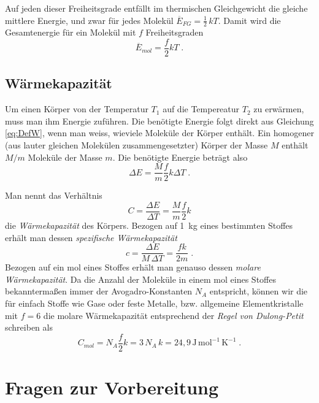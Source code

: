 Auf jeden dieser Freiheitsgrade entfällt im thermischen Gleichgewicht die gleiche mittlere Energie, und zwar für jedes Molekül $\overline{E}_{FG}= \frac{1}{2}\, kT$. Damit wird die Gesamtenergie für ein Molekül mit $f$ Freiheitsgraden
\begin{equation} \label{eq:DefW}
 \overline{E}_{mol} = \frac{f}{2}kT\; .
\end{equation}

\subsection{Wärmekapazität}

Um einen Körper von der Temperatur $T_1$ auf die Tempereatur $T_2$ zu erwärmen, muss man ihm Energie zuführen. Die benötigte Energie folgt direkt aus Gleichung \ref{eq:DefW}, wenn man weiss, wieviele Moleküle der Körper enthält. Ein homogener (aus lauter gleichen Molekülen zusammengesetzter) Körper der Masse $M$ enthält $M/m$ Moleküle der Masse $m$. Die benötigte Energie beträgt also
\begin{equation}
 \Delta E = \frac{M}{m}\frac{f}{2}k\Delta T\; .
\end{equation}

Man nennt das Verhältnis 
\begin{equation}
 C = \frac{\Delta E}{\Delta T} = \frac{M}{m}\frac{f}{2}k
\end{equation}
die \textit{Wärmekapazität} des Körpers. Bezogen auf 1~kg eines bestimmten Stoffes erhält man dessen \textit{spezifische Wärmekapazität} 
\begin{equation} \label{eq:spez_Waermekapazitaet}
 c = \frac{\Delta E}{M\,\Delta T} = \frac{fk}{2m}\; .
\end{equation}
Bezogen auf ein mol eines Stoffes erhält man genauso dessen \textit{molare Wärmekapazität}. Da die Anzahl der Moleküle in einem mol eines Stoffes bekanntermaßen immer der Avogadro-Konstanten $N_A$ entspricht, können wir die für einfach Stoffe wie Gase oder feste Metalle, bzw. allgemeine Elementkristalle mit $f=6$ die molare Wärmekapazität entsprechend der \textit{Regel von Dulong-Petit} schreiben als
\begin{equation} \label{eq:Dulong-Petit}
 C_{mol} = N_A\frac{f}{2}k = 3\,N_A\,k = 24,9\,\mathrm{J\,mol^{-1}\,K^{-1}}\; .
\end{equation}

\section{Fragen zur Vorbereitung}

